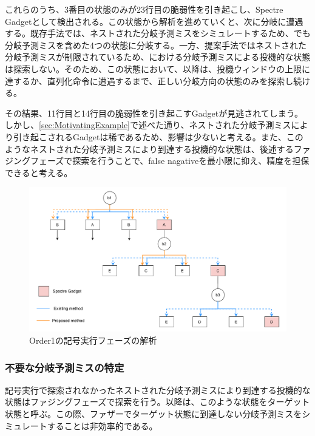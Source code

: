 これらのうち、3番目の状態のみが23行目の脆弱性を引き起こし、Spectre Gadgetとして検出される。この状態から解析を進めていくと、次に分岐に遭遇する。既存手法では、ネストされた分岐予測ミスをシミュレートするため、でも分岐予測ミスを含めた4つの状態に分岐する。一方、提案手法ではネストされた分岐予測ミスが制限されているため、における分岐予測ミスによる投機的な状態は探索しない。そのため、この状態において、以降は、投機ウィンドウの上限に達するか、直列化命令に遭遇するまで、正しい分岐方向の状態のみを探索し続ける。\par

その結果、11行目と14行目の脆弱性を引き起こすGadgetが見逃されてしまう。しかし、\ref{sec:MotivatingExample}で述べた通り、ネストされた分岐予測ミスにより引き起こされるGadgetは稀であるため、影響は少ないと考える。また、このようなネストされた分岐予測ミスにより到達する投機的な状態は、後述するファジングフェーズで探索を行うことで、false nagativeを最小限に抑え、精度を担保できると考える。\par

\begin{figure}[tb]
  \centering
  \includegraphics[width=\linewidth]{img/SpecOrder_cfg.drawio.pdf}
  \caption{Order1の記号実行フェーズの解析}\label{fig:SpecOrder_cfg}
\end{figure}

\subsubsection{不要な分岐予測ミスの特定}

記号実行で探索されなかったネストされた分岐予測ミスにより到達する投機的な状態はファジングフェーズで探索を行う。以降は、このような状態をターゲット状態と呼ぶ。この際、ファザーでターゲット状態に到達しない分岐予測ミスをシミュレートすることは非効率的である。\par

